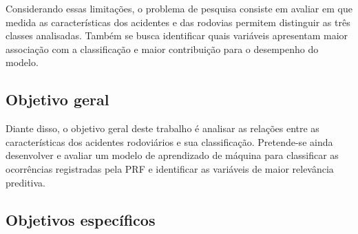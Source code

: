 \documentclass[12pt]{article}
\begin{document}
Considerando essas limitações, o problema de pesquisa consiste em avaliar em que medida as características dos acidentes e das rodovias permitem distinguir as três classes analisadas. Também se busca identificar quais variáveis apresentam maior associação com a classificação e maior contribuição para o desempenho do modelo.

\subsection{Objetivo geral}

Diante disso, o objetivo geral deste trabalho é analisar as relações entre as características dos acidentes rodoviários e sua classificação. Pretende-se ainda desenvolver e avaliar um modelo de aprendizado de máquina para classificar as ocorrências registradas pela PRF e identificar as variáveis de maior relevância preditiva.

\subsection{Objetivos específicos}
\end{document}
